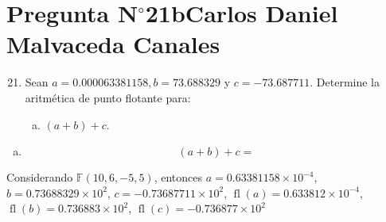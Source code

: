 \section{Pregunta N$^{\circ}$21b\qquad Carlos Daniel Malvaceda Canales}

\begin{frame}
	\begin{enumerate}\setcounter{enumi}{20}
		\item

		      Sean $a=0.000063381158, b=73.688329$ y $c=-73.687711$.
		      Determine la aritmética de punto flotante para:

		      \begin{enumerate}[b)]
			      \item

			            \begin{math}
				            \left(a+b\right)+c
			            \end{math}.
		      \end{enumerate}
	\end{enumerate}

	\begin{solution}
		\begin{enumerate}[b)]
			\item

			      \begin{equation*}
				      \left(a+b\right)+c=
			      \end{equation*}
		\end{enumerate}

		Considerando $\mathbb{F}\left(10,6,-5,5\right)$, entonces
		\begin{math}
			a=0.63381158\times 10^{-4}
		\end{math},
		\begin{math}
			b=0.73688329\times 10^{2}
		\end{math},
		\begin{math}
			c=-0.73687711\times 10^{2}
		\end{math},
		\begin{math}
			\operatorname{fl}\left(a\right)=
			0.633812\times 10^{-4}
		\end{math},
		\begin{math}
			\operatorname{fl}\left(b\right)=
			0.736883\times 10^{2}
		\end{math},
		\begin{math}
			\operatorname{fl}\left(c\right)=
			-0.736877\times 10^{2}
		\end{math}


\end{solution}
\end{frame}
